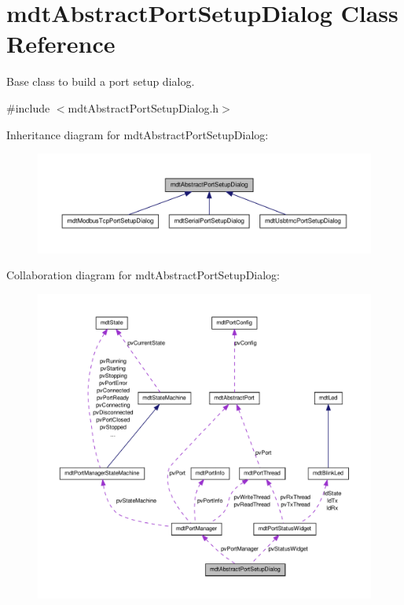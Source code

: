 \hypertarget{classmdt_abstract_port_setup_dialog}{
\section{mdtAbstractPortSetupDialog Class Reference}
\label{classmdt_abstract_port_setup_dialog}
}


Base class to build a port setup dialog.  




{\ttfamily \#include $<$mdtAbstractPortSetupDialog.h$>$}



Inheritance diagram for mdtAbstractPortSetupDialog:\nopagebreak
\begin{figure}[H]
\begin{center}
\leavevmode
\includegraphics[width=400pt]{classmdt_abstract_port_setup_dialog__inherit__graph}
\end{center}
\end{figure}


Collaboration diagram for mdtAbstractPortSetupDialog:
\nopagebreak
\begin{figure}[H]
\begin{center}
\leavevmode
\includegraphics[width=400pt]{classmdt_abstract_port_setup_dialog__coll__graph}
\end{center}
\end{figure}
